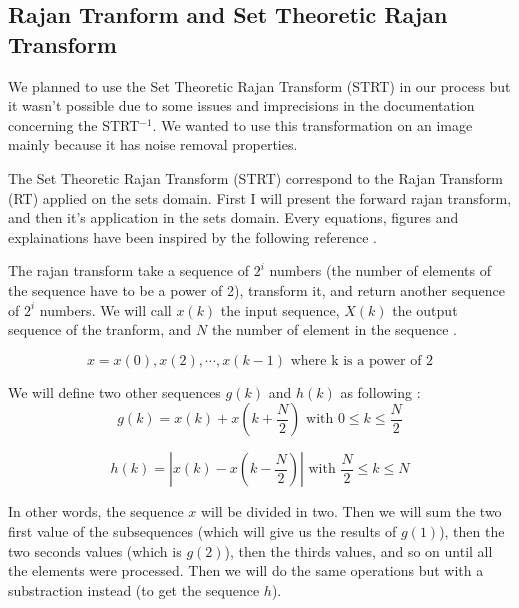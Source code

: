
\subsection{Rajan Tranform and Set Theoretic Rajan Transform}

We planned to use the Set Theoretic Rajan Transform (STRT) in our process but it wasn't possible due to some issues and imprecisions in the documentation concerning the STRT$^{-1}$. We wanted to use this transformation on an image mainly because it has noise removal properties.


The Set Theoretic Rajan Transform (STRT) correspond to the Rajan Transform (RT) applied on the sets domain. First I will present the forward rajan transform, and then it's application in the sets domain. Every equations, figures and explainations have been inspired by the following reference  \cite{bib:symbolic:RajanTransform}.

The rajan transform take a sequence of $2^{i}$ numbers (the number of elements of the sequence have to be a power of 2), transform it, and return another sequence of $2^{i}$ numbers. We will call $x(k)$ the input sequence, $X(k)$ the output sequence of the tranform, and $N$ the number of element in the sequence \cite{bib:symbolic:RajanTransform}. 


\begin{equation}
x = x(0), x(2), \cdots, x(k-1) \text{ where k is a power of 2}
\end{equation}

We will define two other sequences $g(k)$ and $h(k)$ as following : 
\begin{equation}
g(k) = x(k) + x(k + \frac{N}{2}) \text{ with } 0 \leq k \leq \frac{N}{2}
\end{equation}

\begin{equation}
h(k) = | x(k) - x(k - \frac{N}{2}) | \text{ with } \frac{N}{2} \leq k \leq N
\end{equation}


In other words, the sequence $x$ will be divided in two. Then we will sum the two first value of the subsequences (which will give us the results of $g(1)$), then the two seconds values (which is $g(2)$), then the thirds values, and so on until all the elements were processed. Then we will do the same operations but with a substraction instead (to get the sequence $h$).


